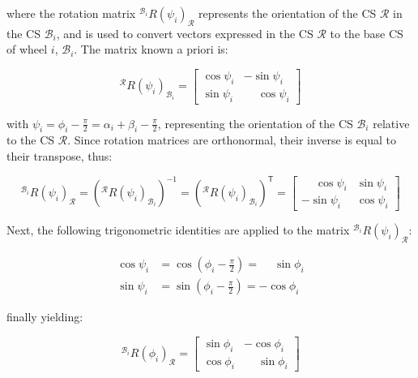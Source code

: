\documentclass[11pt,a4paper]{article}
\newcommand{\trans}{\mathsf{T}}      %
\newcommand{\frameR}{\mathcal{R}}
\newcommand{\frameBi}{\mathcal{B}_i}
\begin{document}
where the rotation matrix \({}^{\frameBi} R(\psi_i)_{\frameR}\) represents the orientation of the CS \(\frameR\) in the CS \(\frameBi\), and is used to convert vectors expressed in the CS \(\frameR\) to the base CS of wheel \(i\), \(\frameBi\). The matrix known a priori is:

\begin{equation}
    {}^\frameR  R(\psi_i)_{\frameBi} =
    \begin{bmatrix}
        \cos\psi_i & -\sin\psi_i           \\
        \sin\psi_i & \phantom{-}\cos\psi_i
    \end{bmatrix}
\end{equation}

with \(\psi_i = \phi_i - \frac{\pi}{2} = \alpha_i + \beta_i - \frac{\pi}{2}\), representing the orientation of the CS \(\frameBi\) relative to the CS \(\frameR\). Since rotation matrices are orthonormal, their inverse is equal to their transpose, thus:

\begin{equation}
    {}^{\frameBi} R(\psi_i)_{\frameR} = \left({}^\frameR  R(\psi_i)_{\frameBi}\right)^{-1} = \left({}^\frameR  R(\psi_i)_{\frameBi}\right)^{\trans} =
    \begin{bmatrix}
        \phantom{-}\cos\psi_i & \sin\psi_i \\
        -\sin\psi_i           & \cos\psi_i
    \end{bmatrix}
\end{equation}

Next, the following trigonometric identities are applied to the matrix \({}^{\frameBi} R(\psi_i)_{\frameR}\):

\[
    \begin{aligned}
        \cos\psi_i & = \cos\left(\phi_i - \frac{\pi}{2}\right) = \phantom{-}\sin\phi_i \\
        \sin\psi_i & = \sin\left(\phi_i - \frac{\pi}{2}\right) = -\cos\phi_i
    \end{aligned}
\]

finally yielding:

\begin{equation}
    {}^{\frameBi}  R(\phi_i)_{\frameR} =
    \begin{bmatrix}
        \sin\phi_i & -\cos\phi_i           \\
        \cos\phi_i & \phantom{-}\sin\phi_i
    \end{bmatrix}
\end{equation}
\end{document}
